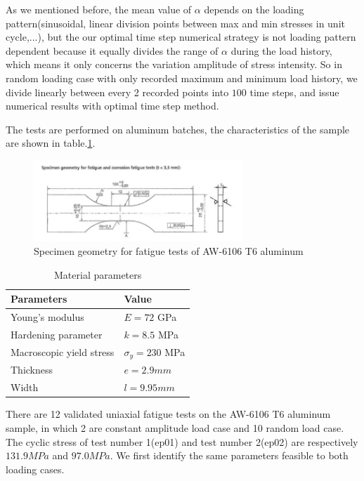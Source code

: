 As we mentioned before, the mean value of $\alpha$ depends on the loading pattern(sinusoidal, linear division points between max and min stresses in unit cycle,...), but the our optimal time step numerical strategy is not loading pattern dependent because it equally divides the range of $\alpha$ during the load history, which means it only concerns the variation amplitude of stress intensity. So in random loading case with only recorded maximum and minimum load history, we divide linearly between every 2 recorded points into $100$ time steps, and issue numerical results with optimal time step method.

The tests are performed on aluminum batches, the characteristics of the sample are shown in table.\ref{tab:cetim}.
\begin{figure}[!h]
\centering
\includegraphics[width=0.7\textwidth]{figures//aluminum_cetim.png} 
\caption{Specimen geometry for fatigue tests of AW-6106 T6 aluminum}
\label{fig:aluminum}
\end{figure}
\begin{table}[!h]
\centering
\begin{tabular}{ll}
\hline
\textbf{Parameters}                                         & \textbf{Value}                    \\ \hline
Young's modulus                                             & $E=72$ GPa                       \\
Hardening parameter                                         &  $k=8.5$ MPa \\
Macroscopic yield stress                                    & $\sigma_y=230$ MPa              \\
Thickness & $e=2.9mm$                        \\
Width		 & $l= 9.95mm$                        \\ \hline
\end{tabular}
\caption{Material parameters}
\label{tab:cetim}
\end{table}

There are 12 validated uniaxial fatigue tests on the AW-6106 T6 aluminum sample, in which 2 are constant amplitude load case and 10 random  load case. 
The cyclic stress of test number 1(ep01) and test number 2(ep02) are respectively $131.9MPa$ and $97.0MPa$. We first identify the same parameters feasible to both loading cases. 

